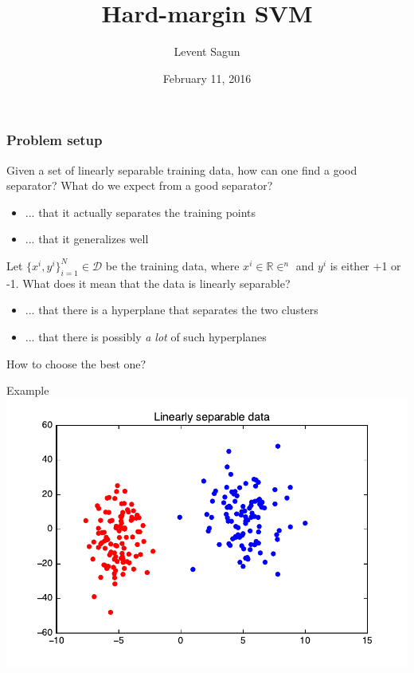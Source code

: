 \documentclass{beamer}
\title{Hard-margin SVM}
\author{Levent Sagun}
\institute{New York University}
\date{February 11, 2016}
\begin{document}

\frame{\titlepage}


\begin{frame}
\frametitle{Problem setup}

Given a set of linearly separable training data, how can one find a good separator? What do we expect from a good separator? 

\begin{itemize}
    \item<1-> ... that it actually separates the training points
    \item<1-> ... that it generalizes well
\end{itemize}

Let $\{x^i, y^i\}_{i=1}^N \in \mathcal{D} $ be the training data, where $x^i \in \mathbb{R}\in^n$ and $y^i$ is either +1 or -1. What does it mean that the data is linearly separable?

\begin{itemize}
    \item<1-> ... that there is a hyperplane that separates the two clusters
    \item<1-> ... that there is possibly \textit{a lot} of such hyperplanes
\end{itemize}

How to choose the best one?

\end{frame}
 

\begin{frame}{Example}
    \includegraphics[scale=0.7]{figures/SVM_data.pdf}
\end{frame}
\end{document}
